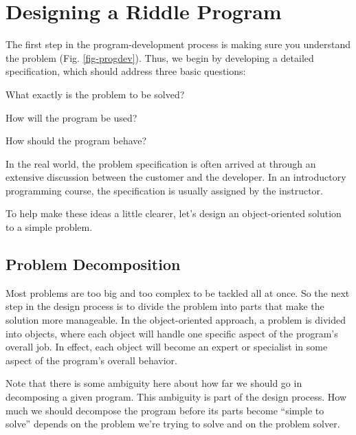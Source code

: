 \section{Designing a Riddle Program}

The first step in the program-development process is making sure you
understand the problem (Fig. \ref{fig-progdev}).  Thus, we begin by
developing a detailed specification, which should address three basic
questions:

\begin{BL}
\item  What exactly is the problem to be solved?
\item  How will the program be used?
\item  How should the program behave?
\end{BL}

\noindent In the real world, the problem specification is often
arrived at through an extensive discussion between the customer and
the developer.  In an introductory programming course, the
specification is usually assigned by the instructor.

To help make these ideas a little clearer, let's design an
object-oriented solution to a simple problem.


\subsection{Problem Decomposition}

\noindent Most problems are too big and too complex to be tackled
all at once. So the next step in the design process is to divide the
problem into parts that make the solution more manageable.  In the
object-oriented approach, a problem is divided into objects, where
each object will handle one specific aspect of the program's overall
job. In effect, each object will become an expert or specialist in
some aspect of the program's overall behavior.

Note that there is some ambiguity here about how far we should go in
decomposing a given program.  This ambiguity is part of the design
process.  How much we should decompose the program before its parts
become ``simple to solve'' depends on the problem we're trying to
solve and on the problem solver.

